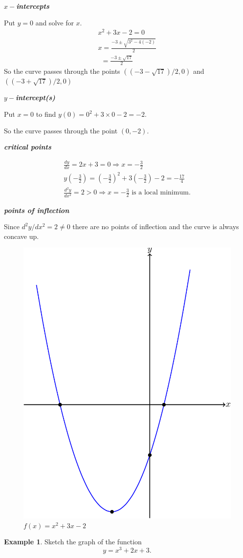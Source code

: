 \documentclass[
  11pt,
  oneside]{book}
\newcommand{\slide}{}
\theoremstyle{definition}
\theoremstyle{definition}
\newtheorem{example}{Example}[chapter]
\theoremstyle{definition}
\theoremstyle{definition}
\theoremstyle{remark}
\begin{document}
\slide

\textbf{\emph{\(x-\)intercepts}}

Put \(y=0\) and solve for \(x\).
\begin{gather*}
x^2+3x-2 = 0\\
x = \frac{-3\pm\sqrt{3^2-4(-2)}}{2}\\
\ \ =\frac{-3\pm\sqrt{17}}{2}
\end{gather*}
So the curve passes through the points \(((-3-\sqrt{17})/2,0)\) and\(((-3+\sqrt{17})/2,0)\)

\textbf{\emph{\(y-\)intercept(s)}}

Put \(x=0\) to find \(y(0) = 0^2+3\times0-2 = -2\).

So the curve passes through the point \((0,-2)\).

\slide

\textbf{\emph{critical points}}

\begin{gather*}
\frac{dy}{dx} = 2x+3 = 0 \Rightarrow x = -\frac{3}{2}\\
y(-\frac32) = \left(-\frac32\right)^2 +3\left(-\frac 32\right) - 2 = -\frac{17}4\\
\frac{d^2y}{dx^2} = 2>0\Rightarrow x=-\frac 32\text{ is a local minimum}.
\end{gather*}

\textbf{\emph{points of inflection}}

Since \(d^2y/dx^2 = 2\ne0\) there are no points of inflection and the curve is always concave up.

\begin{figure}

{\centering \includegraphics[width=0.3\linewidth]{tikztopng-figure16} 

}

\caption{$f(x) = x^2+3x-2$}\label{fig:unnamed-chunk-25}
\end{figure}
\slide

\begin{example}
Sketch the graph of the function
\[
y = x^3+2x+3.
\]
\end{example}
\end{document}
